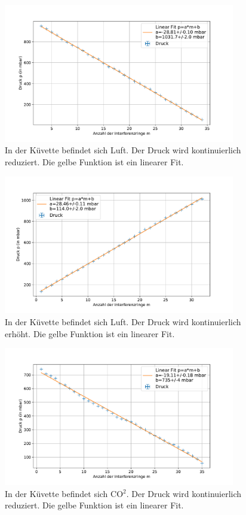 \documentclass[
	a4paper,
	12pt,
	pagesize,
	ngerman
]{scrartcl}
\begin{document}
\begin{figure}[H] %
		\includegraphics[width=0.9\textwidth]{images/Luft_Raus.pdf}
		\centering
		\caption{In der Küvette befindet sich Luft. Der Druck wird kontinuierlich reduziert. Die gelbe Funktion ist ein linearer Fit.}
		\label{fig_luft_raus}
	\end{figure}
\begin{figure}[H]
		\includegraphics[width=0.9\textwidth]{images/Luft_Rein.pdf}
		\centering
		\caption{In der Küvette befindet sich Luft. Der Druck wird kontinuierlich erhöht. Die gelbe Funktion ist ein linearer Fit.}
		\label{fig_luft_rein}
	\end{figure}
\begin{figure}[H]
		\includegraphics[width=0.9\textwidth]{images/CO2_Raus.pdf}
		\centering
		\caption{In der Küvette befindet sich CO$^2$. Der Druck wird kontinuierlich reduziert. Die gelbe Funktion ist ein linearer Fit.}
		\label{fig_co2_raus}
	\end{figure}
\end{document}
